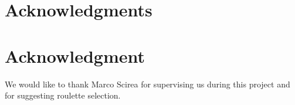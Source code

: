 \documentclass[conference,compsoc]{IEEEtran}
\begin{document}
\newpage

\nocite{*} %
 


\ifCLASSOPTIONcompsoc
  \section*{Acknowledgments}
\else
  \section*{Acknowledgment}
\fi
We would like to thank Marco Scirea for supervising us during this project and for suggesting roulette selection.\\
\end{document}
